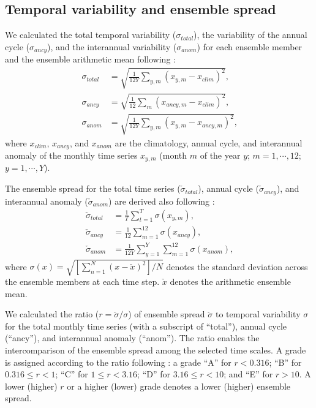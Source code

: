 \documentclass[essd, manuscript]{copernicus}
\begin{document}
\subsection{Temporal variability and ensemble spread}\label{sec:methods:variation}

We calculated the total temporal variability (\(\sigma_{total}\)), the variability of the annual cycle (\(\sigma_{ancy}\)), and the interannual variability (\(\sigma_{anom}\)) for each ensemble member and the ensemble arithmetic mean following \citet{dirmeyer2006BAMS}:
\begin{align}
  \sigma_{total} & = \sqrt{\frac{1}{12 Y}\sum_{y,m} (x_{y,m} - x_{clim})^2}
  \text{,}
  \label{eq:var:total} \\
  \sigma_{ancy}  & = \sqrt{\frac{1}{12}\sum_{m} (x_{ancy,m} - x_{clim})^2}
  \text{,} \\
  \sigma_{anom}  & = \sqrt{\frac{1}{12 Y} \sum_{y,m} (x_{y,m} - x_{ancy,m})^2}
  \text{,}
\end{align}
where \(x_{clim}\), \(x_{ancy}\), and \(x_{anom}\) are the climatology, annual cycle, and interannual anomaly of the monthly time series \(x_{y,m}\) (month \(m\) of the year \(y\); \(m=1, \cdots, 12\); \(y=1, \cdots, Y\)).

The ensemble spread for the total time series (\(\check{\sigma}_{total}\)), annual cycle (\(\check{\sigma}_{ancy}\)), and interannual anomaly (\(\check{\sigma}_{anom}\)) are derived also following \citet{dirmeyer2006BAMS}:
\begin{align}
  \check{\sigma}_{total} & = \frac{1}{T} \sum_{t=1}^{T} \sigma(x_{y,m})
  \text{,} \\
  \check{\sigma}_{ancy}  & = \frac{1}{12} \sum_{m=1}^{12} \sigma(x_{ancy})
  \text{,} \\
  \check{\sigma}_{anom}  & = \frac{1}{12Y} \sum_{y=1}^{Y} \sum_{m=1}^{12} \sigma(x_{anom})
  \text{,}
\end{align}
where \(\sigma(x) = \sqrt{[\sum_{n=1}^{N}(x-\check{x})^2]/N}\) denotes the standard deviation across the ensemble members at each time step. \(\check{x}\) denotes the arithmetic ensemble mean.

We calculated the ratio (\(r=\check{\sigma}/\sigma\)) of ensemble spread \(\check{\sigma}\) to temporal variability \(\sigma\) for the total monthly time series (with a subscript of ``total''), annual cycle (``ancy''), and interannual anomaly (``anom''). The ratio enables the intercomparison of the ensemble spread among the selected time scales. A grade is assigned according to the ratio following \citet{dirmeyer2006BAMS}: a grade ``A'' for \(r < 0.316\); ``B'' for \(0.316 \le r < 1\); ``C'' for \(1 \le r < 3.16\); ``D'' for \(3.16 \le r < 10\); and ``E'' for \(r > 10\). A lower (higher) \(r\) or a higher (lower) grade denotes a lower (higher) ensemble spread.
\end{document}
